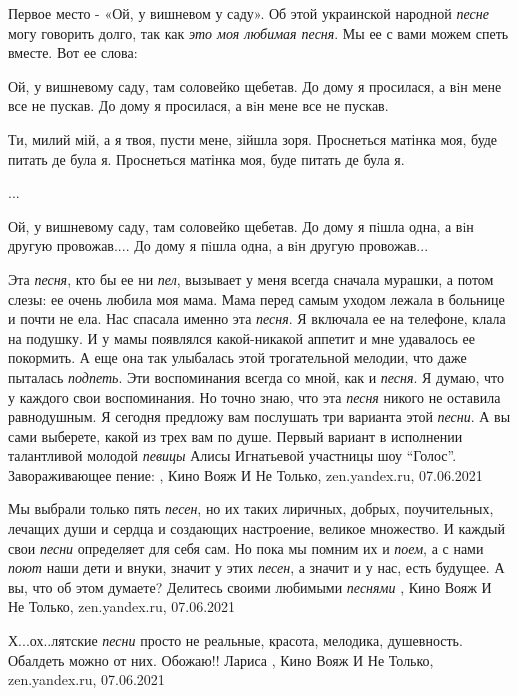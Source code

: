 Первое место - «Ой, у вишневом у саду».  Об этой украинской народной \emph{песне} могу
говорить долго, так как \emph{это моя любимая песня}. Мы ее с вами можем спеть вместе.
Вот ее слова:

Ой, у вишневому саду, там соловейко щебетав.
До дому я просилася, а вiн мене все не пускав.
До дому я просилася, а вiн мене все не пускав.

Ти, милий мій, а я твоя, пусти мене, зійшла зоря.
Проснеться матінка моя, буде питать де була я.
Проснеться матінка моя, буде питать де була я.

...

Ой, у вишневому саду, там соловейко щебетав.
До дому я пiшла одна, а вiн другую провожав....
До дому я пiшла одна, а вiн другую провожав...

Эта \emph{песня}, кто бы ее ни \emph{пел}, вызывает у меня всегда сначала мурашки, а
потом слезы: ее очень любила моя мама. Мама перед самым уходом лежала в
больнице и почти не ела. Нас спасала именно эта \emph{песня}. Я включала ее на
телефоне, клала на подушку. И у мамы появлялся какой-никакой аппетит и мне
удавалось ее покормить.  А еще она так улыбалась этой трогательной мелодии, что
даже пыталась \emph{подпеть}. Эти воспоминания всегда со мной, как и
\emph{песня}.  Я думаю, что у каждого свои воспоминания. Но точно знаю, что эта
\emph{песня} никого не оставила равнодушным. Я сегодня предложу вам послушать
три варианта этой \emph{песни}. А вы сами выберете, какой из трех вам по душе.
Первый вариант в исполнении талантливой молодой \emph{певицы} Алисы Игнатьевой
участницы шоу \enquote{Голос}. Завораживающее пение:
, 
Кино Вояж И Не Только, zen.yandex.ru, 07.06.2021

Мы выбрали только пять \emph{песен}, но их таких лиричных, добрых, поучительных,
лечащих души и сердца и создающих настроение, великое множество. И каждый свои
\emph{песни} определяет для себя сам. Но пока мы помним их и \emph{поем}, а с нами \emph{поют} наши
дети и внуки, значит у этих \emph{песен}, а значит и у нас, есть будущее. А вы, что
об этом думаете? Делитесь своими любимыми \emph{песнями}
, 
Кино Вояж И Не Только, zen.yandex.ru, 07.06.2021

Х...ох..лятские \emph{песни} просто не реальные, красота, мелодика, душевность.
Обалдеть можно от них. Обожаю!!
Лариса
, 
Кино Вояж И Не Только, zen.yandex.ru, 07.06.2021


